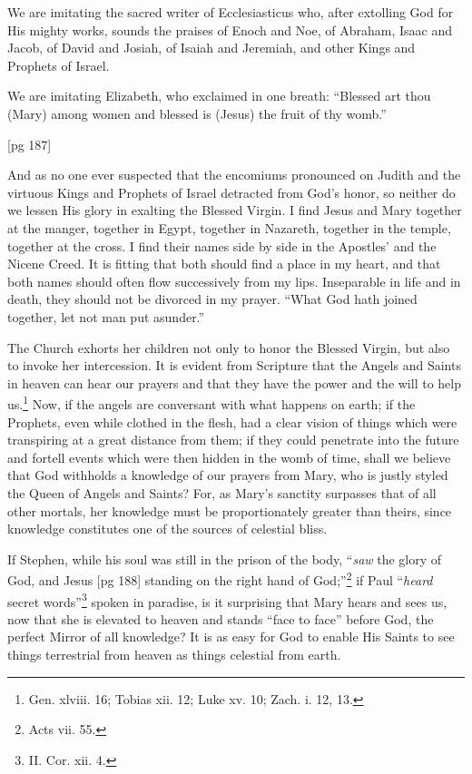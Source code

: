 We are imitating the sacred writer of Ecclesiasticus
who, after extolling God for His mighty
works, sounds the praises of Enoch and Noe, of
Abraham, Isaac and Jacob, of David and Josiah, of
Isaiah and Jeremiah, and other Kings and Prophets
of Israel.

We are imitating Elizabeth, who exclaimed in
one breath: “Blessed art thou (Mary) among women
and blessed is (Jesus) the fruit of thy womb.”

[pg 187]

And as no one ever suspected that the encomiums
pronounced on Judith and the virtuous Kings and
Prophets of Israel detracted from God's honor,
so neither do we lessen His glory in exalting the
Blessed Virgin. I find Jesus and Mary together
at the manger, together in Egypt, together in
Nazareth, together in the temple, together at the
cross. I find their names side by side in the Apostles'
and the Nicene Creed. It is fitting that both
should find a place in my heart, and that both
names should often flow successively from my
lips. Inseparable in life and in death, they should
not be divorced in my prayer. “What God hath
joined together, let not man put asunder.”


The Church exhorts her children not only to
honor the Blessed Virgin, but also to invoke her
intercession. It is evident from Scripture that
the Angels and Saints in heaven can hear our
prayers and that they have the power and the
will to help us.\footnote{Gen. xlviii.
16; Tobias xii. 12; Luke xv. 10; Zach. i. 12,
13.} Now, if the angels are conversant
with what happens on earth; if the Prophets, even
while clothed in the flesh, had a clear vision of
things which were transpiring at a great distance
from them; if they could penetrate into the future
and fortell events which were then hidden in the
womb of time, shall we believe that God withholds
a knowledge of our prayers from Mary, who is
justly styled the Queen of Angels and Saints?
For, as Mary's sanctity surpasses that of all other
mortals, her knowledge must be proportionately
greater than theirs, since knowledge constitutes
one of the sources of celestial bliss.

If Stephen, while his soul was still in the prison
of the body, “\emph{saw} the glory of God, and Jesus
[pg 188]
standing on the right hand of
God;”\footnote{Acts vii. 55.} if Paul
“\emph{heard} secret words”\footnote{II.
Cor. xii. 4.} spoken in paradise, is it
surprising that Mary hears and sees us, now that
she is elevated to heaven and stands “face to
face” before God, the perfect Mirror of all knowledge?
It is as easy for God to enable His Saints
to see things terrestrial from heaven as things
celestial from earth.

